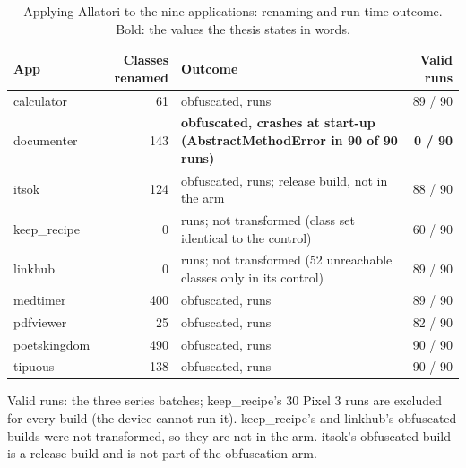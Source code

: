 \begin{table}[t]
\centering
\small
\caption{Applying Allatori to the nine applications: renaming and run-time outcome. Bold: the values the thesis states in words.}
\label{tab:allatori}
\begin{tabular}{lrp{7cm}r}
\toprule
\textbf{App} & \textbf{Classes renamed} & \textbf{Outcome} & \textbf{Valid runs} \\
\midrule
calculator & 61 & obfuscated, runs & 89 / 90 \\
documenter & 143 & \textbf{obfuscated, crashes at start-up (AbstractMethodError in 90 of 90 runs)} & \textbf{0 / 90} \\
itsok & 124 & obfuscated, runs; release build, not in the arm & 88 / 90 \\
keep\_recipe & 0 & runs; not transformed (class set identical to the control) & 60 / 90 \\
linkhub & 0 & runs; not transformed (52 unreachable classes only in its control) & 89 / 90 \\
medtimer & 400 & obfuscated, runs & 89 / 90 \\
pdfviewer & 25 & obfuscated, runs & 82 / 90 \\
poetskingdom & 490 & obfuscated, runs & 90 / 90 \\
tipuous & 138 & obfuscated, runs & 90 / 90 \\
\bottomrule
\end{tabular}
\par\smallskip\footnotesize Valid runs: the three series batches; keep\_recipe's 30 Pixel 3 runs are excluded for every build (the device cannot run it). keep\_recipe's and linkhub's obfuscated builds were not transformed, so they are not in the arm. itsok's obfuscated build is a release build and is not part of the obfuscation arm.
\end{table}
